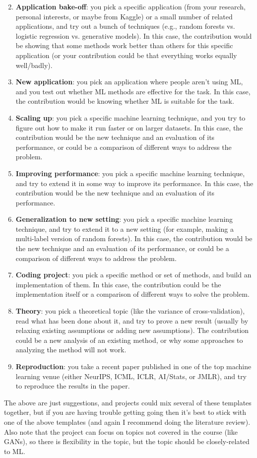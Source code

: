 \documentclass{article}
\def\enum#1{\begin{enumerate}#1\end{enumerate}}
\begin{document}
\enum{
\setcounter{enumi}{1}
\item \textbf{Application bake-off}: you pick a specific application (from your research, personal interests, or maybe from Kaggle) or a small number of related applications, and try out a bunch of techniques (e.g., random forests vs. logistic regression vs. generative models). In this case, the contribution would be showing that some methods work better than others for this specific application (or your contribution could be that everything works equally well/badly).
\item \textbf{New application}: you pick an application where people aren't using ML, and you test out whether ML methods are effective for the task. In this case, the contribution would be knowing whether ML is suitable for the task.
\item \textbf{Scaling up}: you pick a specific machine learning technique, and you try to figure out how to make it run faster or on larger datasets. In this case, the contribution would be the new technique and an evaluation of its performance, or could be a comparison of different ways to address the problem.
\item \textbf{Improving performance}: you pick a specific machine learning technique, and try to extend it in some way to improve its performance. In this case, the contribution would be the new technique and an evaluation of its performance.
\item \textbf{Generalization to new setting}: you pick a specific machine learning technique, and try to extend it to a new setting (for example, making a multi-label version of random forests).  In this case, the contribution would be the new technique and an evaluation of its performance, or could be a comparison of different ways to address the problem.
\item \textbf{Coding project}: you pick a specific method or set of methods, and build an implementation of them. In this case, the contribution could be the implementation itself or a comparison of different ways to solve the problem.
\item \textbf{Theory}: you pick a theoretical topic (like the variance of cross-validation), read what has been done about it, and try to prove a new result (usually by relaxing existing assumptions or adding new assumptions). The contribution could be a new analysis of an existing method, or why some approaches to analyzing the method will not work.
\item \textbf{Reproduction}: you take a recent paper published in one of the top machine learning venue (either NeurIPS, ICML, ICLR, AI/Stats, or JMLR), and try to reproduce the results in the paper.
}
The above are just suggestions, and  projects could mix several of these templates together, but if you are having trouble getting going then it's best to stick with one of the above templates (and again I recommend doing the literature review). Also note that the project can focus on topics not covered in the course (like GANs), so there is flexibility in the topic, but the topic should be closely-related to ML.
\end{document}
